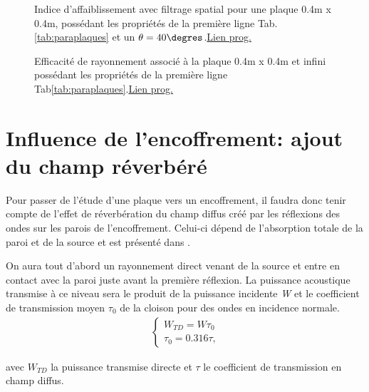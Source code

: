 \documentclass[12pt,foolscap]{report}
\begin{document}
	\begin{figure}[h]
		\begin{minipage}[c]{.45\linewidth}
			\begin{center}
				\caption{Indice d'affaiblissement avec filtrage spatial pour une plaque 0.4m x 0.4m, possédant les propriétés de la première ligne Tab. \ref{tab:paraplaques} et un $\theta=40\degres$.\href{https://github.com/Nuopel/Encoffrement/blob/master/Programme/simplecloison_finite_size.m}{Lien prog.}}
				\label{fini1}
			\end{center}
		\end{minipage}
		\hfill
		\begin{minipage}[c]{.45\linewidth}
			\begin{center}
				\caption{Efficacité de rayonnement associé à la plaque 0.4m x 0.4m et infini possédant les propriétés de la première ligne Tab\ref{tab:paraplaques}.\href{https://github.com/Nuopel/Encoffrement/blob/master/Programme/simplecloison_finite_size.m}{Lien prog.}}
				\label{finisig}
			\end{center}
		\end{minipage}
	\end{figure}
	\section{Influence de l'encoffrement: ajout du champ réverbéré}
	Pour passer de l'étude d'une plaque vers un encoffrement, il faudra donc tenir compte de l'effet de réverbération du champ diffus créé par les réflexions des ondes sur les parois de l'encoffrement.
	Celui-ci dépend de l'absorption totale de la paroi et de la source et est présenté dans \cite{vas}. 
	
	On aura tout d'abord un rayonnement direct venant de la source et entre en contact avec la paroi juste avant la première réflexion. La puissance acoustique transmise à ce niveau sera le produit de la puissance incidente \textit{W} et le coefficient de transmission moyen \({\tau _0}\) de la cloison pour des ondes en incidence normale.
	\begin{align}
	\begin{cases}
	W_{TD} = W{\tau _0} \\
	\tau _0 = 0.316\tau  \text{,}
	\end{cases}
	\end{align}
	
	avec \({W_{TD}}\) la puissance transmise directe et \({\tau}\) le coefficient de transmission en champ diffus.\\
	
\end{document}

